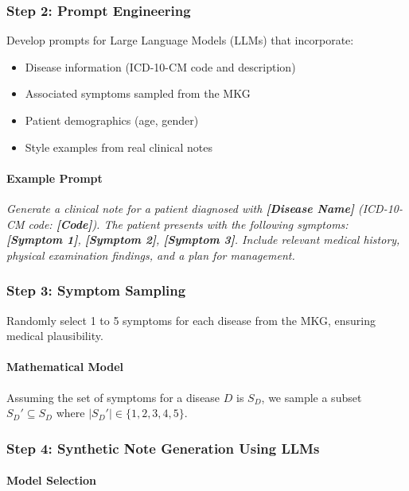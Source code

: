 \documentclass[12pt, a4paper]{article}
\begin{document}
\subsubsection{Step 2: Prompt Engineering}

Develop prompts for Large Language Models (LLMs) that incorporate:

\begin{itemize}
    \item Disease information (ICD-10-CM code and description)
    \item Associated symptoms sampled from the MKG
    \item Patient demographics (age, gender)
    \item Style examples from real clinical notes
\end{itemize}

\paragraph{Example Prompt}

\textit{Generate a clinical note for a patient diagnosed with \textbf{[Disease Name]} (ICD-10-CM code: \textbf{[Code]}). The patient presents with the following symptoms: \textbf{[Symptom 1]}, \textbf{[Symptom 2]}, \textbf{[Symptom 3]}. Include relevant medical history, physical examination findings, and a plan for management.}

\subsubsection{Step 3: Symptom Sampling}

Randomly select 1 to 5 symptoms for each disease from the MKG, ensuring medical plausibility.

\paragraph{Mathematical Model}

Assuming the set of symptoms for a disease \( D \) is \( S_D \), we sample a subset \( S_D' \subseteq S_D \) where \( |S_D'| \in \{1, 2, 3, 4, 5\} \).

\subsubsection{Step 4: Synthetic Note Generation Using LLMs}

\paragraph{Model Selection}
\end{document}
